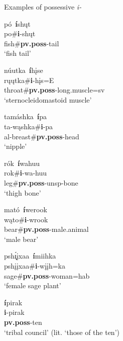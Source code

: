 \begin{exe}
\item\label{possessivepreverb} Examples of possessive \textit{i-}

	\begin{xlist}
	
	\item \glll pó~\textbf{í}shųt\\
	po\#\textbf{i}-shųt\\
	\textnormal{fish}\#\textbf{pv.poss}-\textnormal{tail}\\
	\glt `fish tail' \citep[438]{hollow1970}
	
	\item \glll núutka~\textbf{í}hįse\\
	rųųtka\#\textbf{i}-hįs=E\\
	\textnormal{throat}\#\textbf{pv.poss}-\textnormal{long.muscle}=sv\\
	\glt `sternocleidomastoid muscle' \citep[75]{hollow1970}
	
	\item \glll tamáshka~\textbf{í}pa\\
	ta-wąshka\#\textbf{i}-pa\\
	al-\textnormal{breast}\#\textbf{pv.poss}-\textnormal{head}\\
	\glt `nipple' \citep[142]{hollow1970}
	
	\item \glll rók~\textbf{í}wahuu\\
	rok\#\textbf{i}-wa-huu\\
	\textnormal{leg}\#\textbf{pv.poss}-unsp-\textnormal{bone}\\
	\glt `thigh bone' \citep[187]{hollow1970}
	
	\item \glll mató~\textbf{í}werook\\
	wąto\#\textbf{i}-wrook\\
	\textnormal{bear}\#\textbf{pv.poss}-\textnormal{male.animal}\\
	\glt `male bear' \citep[306]{hollow1970}
	
	\item \glll psh\'{ı̨}įxaa~\textbf{í}miihka\\
	pshįįxaa\#\textbf{i}-wįįh=ka\\
	\textnormal{sage}\#\textbf{pv.poss}-\textnormal{woman}=hab\\
	\glt `female sage plant' \citep[286]{hollow1970}
	
	\item \glll \textbf{í}pirak\\
	\textbf{i}-pirak\\
	\textbf{pv.poss}-\textnormal{ten}\\
	\glt `tribal council' (lit. `those of the ten') \citep[420]{hollow1970}
	

\end{xlist}
\end{exe}
